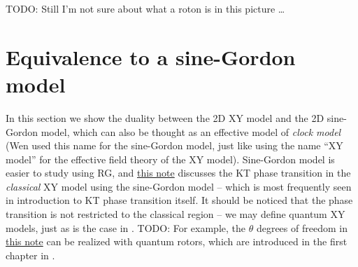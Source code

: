 \documentclass[hyperref, a4paper]{article}
\newcommand{\ktnote}{\href{../topological-phases-reading-notes/kt.pdf}{this note}}
\begin{document}
TODO: Still I'm not sure about what a roton is in this picture \ldots

\section{Equivalence to a sine-Gordon model}

In this section we show the duality between the 2D XY model and the 2D sine-Gordon model, which can also 
be thought as an effective model of \emph{clock model} (Wen used this name for the sine-Gordon model, just 
like using the name ``XY model'' for the effective field theory of the XY model). 
Sine-Gordon model is easier to study using RG, and \ktnote{} discusses the KT phase transition in the 
\emph{classical} XY model using the sine-Gordon model -- which is most frequently 
seen in introduction to KT phase transition itself. It should be noticed that the 
phase transition is not restricted to the classical region -- we may define quantum XY models, just as
is the case in . 
TODO: For example, the $\theta$ degrees of freedom in \ktnote{} can be realized with quantum rotors, which are 
introduced in the first chapter in \cite{Sachdev2009}. 
\end{document}
